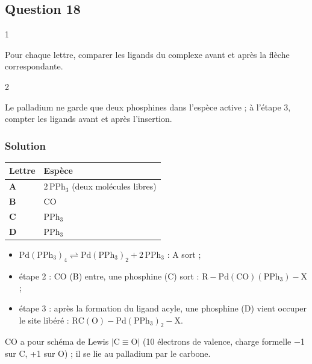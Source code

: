 \documentclass[11pt,a4paper]{article}
\providecommand{\tightlist}{\setlength{\itemsep}{0pt}\setlength{\parskip}{0pt}}
\begin{document}
\hypertarget{question-18}{%
\subsection{Question 18}\label{question-18}}

\begin{indication}{1}

Pour chaque lettre, comparer les ligands du complexe avant et après la flèche correspondante.

\end{indication}

\begin{indication}{2}

Le palladium ne garde que deux phosphines dans l'espèce active ; à l'étape 3, compter les ligands avant et après l'insertion.

\end{indication}

\hypertarget{solution-17}{%
\subsubsection{Solution}\label{solution-17}}

\begin{longtable}[]{@{}ll@{}}
\toprule\noalign{}
Lettre & Espèce \\
\midrule\noalign{}
\endhead
\bottomrule\noalign{}
\endlastfoot
\textbf{A} & \(2\,\mathrm{PPh_3}\) (deux molécules libres) \\
\textbf{B} & \(\mathrm{CO}\) \\
\textbf{C} & \(\mathrm{PPh_3}\) \\
\textbf{D} & \(\mathrm{PPh_3}\) \\
\end{longtable}

\begin{itemize}
\tightlist
\item
  \(\mathrm{Pd(PPh_3)_4}\rightleftharpoons\mathrm{Pd(PPh_3)_2}+2\,\mathrm{PPh_3}\) : A sort ;
\item
  étape 2 : CO (B) entre, une phosphine (C) sort : \(\mathrm{R{-}Pd(CO)(PPh_3){-}X}\) ;
\item
  étape 3 : après la formation du ligand acyle, une phosphine (D) vient occuper le site libéré : \(\mathrm{RC(O){-}Pd(PPh_3)_2{-}X}\).
\end{itemize}

CO a pour schéma de Lewis \(|\mathrm{C}{\equiv}\mathrm{O}|\) (10 électrons de valence, charge formelle −1 sur C, +1 sur O) ; il se lie au palladium par le carbone.
\end{document}
